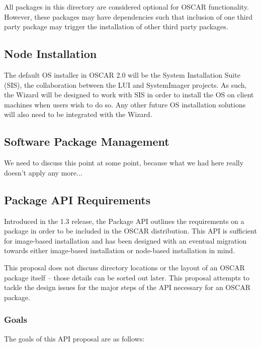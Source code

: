 All packages in this directory are considered optional for OSCAR
functionality.  However, these packages may have dependencies such
that inclusion of one third party package may trigger the installation
of other third party packages.


\subsection{Node Installation}

The default OS installer in OSCAR 2.0 will be the System Installation
Suite (SIS), the collaboration between the LUI and SystemImager
projects. As such, the Wizard will be designed to work with SIS in
order to install the OS on client machines when users wish to do so.
Any other future OS installation solutions will also need to be
integrated with the Wizard.


\subsection{Software Package Management}
\label{sec:design-software-package-mgmt}

\begin{discuss}
We need to discuss this point at some point, because what we had here
really doesn't apply any more...
\end{discuss}

\subsection{Package API Requirements}

Introduced in the 1.3 release, the Package API outlines the
requirements on a package in order to be included in the OSCAR
distribution.  This API is sufficient for image-based installation and
has been designed with an eventual migration towards either
image-based installation or node-based installation in mind.

This proposal does not discuss directory locations or the layout of an
OSCAR package itself -- those details can be sorted out later.  This
proposal attempts to tackle the design issues for the major steps of
the API necessary for an OSCAR package.


\subsubsection{Goals}

The goals of this API proposal are as follows:


